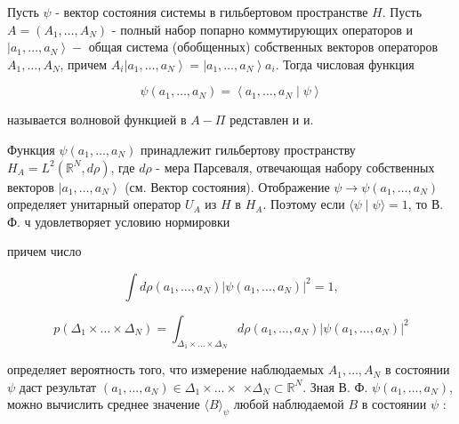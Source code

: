 \documentclass[10pt]{article}
\begin{document}
Пусть $\psi$ - вектор состояния системы в гильбертовом пространстве $H$. Пусть $A=\left(A_{1}, \ldots, A_{N}\right)$ - полный набор попарно коммутирующих операторов и $\left|a_{1}, \ldots, a_{N}\right\rangle-$ общая система (обобщенных) собственных векторов операторов $A_{1}, \ldots, A_{N}$, причем $A_{i}\left|a_{1}, \ldots, a_{N}\right\rangle=\left|a_{1}, \ldots, a_{N}\right\rangle a_{i}$. Тогда числовая функция



\[

\psi\left(a_{1}, \ldots, a_{N}\right)=\left\langle a_{1}, \ldots, a_{N} \mid \psi\right\rangle

\]



называется волновой функцией в $A-\Pi$ редставлен и и.



Функция $\psi\left(a_{1}, \ldots, a_{N}\right)$ принадлежит гильбертову пространству $H_{A}=L^{2}\left(\mathbb{R}^{N}, d \rho\right)$, где $d \rho$ - мера Парсеваля, отвечающая набору собственных векторов $\left|a_{1}, \ldots, a_{N}\right\rangle$ (см. Вектор состояния). Отображение $\psi \rightarrow \psi\left(a_{1}, \ldots, a_{N}\right)$ определяет унитарный оператор $U_{A}$ из $H$ в $H_{A}$. Поэтому если $\langle\psi \mid \psi\rangle=1$, то В. Ф. ч удовлетворяет условию нормировки



причем число



\[

\int d \rho\left(a_{1}, \ldots, a_{N}\right)\left|\psi\left(a_{1}, \ldots, a_{N}\right)\right|^{2}=1,

\]



\[

p\left(\Delta_{1} \times \ldots \times \Delta_{N}\right)=\int_{\Delta_{1} \times \ldots \times \Delta_{N}} d \rho\left(a_{1}, \ldots, a_{N}\right)\left|\psi\left(a_{1}, \ldots, a_{N}\right)\right|^{2}

\]



определяет вероятность того, что измерение наблюдаемых $A_{1}, \ldots, A_{N}$ в состоянии $\psi$ даст результат $\left(a_{1}, \ldots, a_{N}\right) \in \Delta_{1} \times \ldots \times$ $\times \Delta_{N} \subset \mathbb{R}^{N}$. Зная В. Ф. $\psi\left(a_{1}, \ldots, a_{N}\right)$, можно вычислить среднее значение $\langle B\rangle_{\psi}$ любой наблюдаемой $B$ в состоянии $\psi$ :
\end{document}
